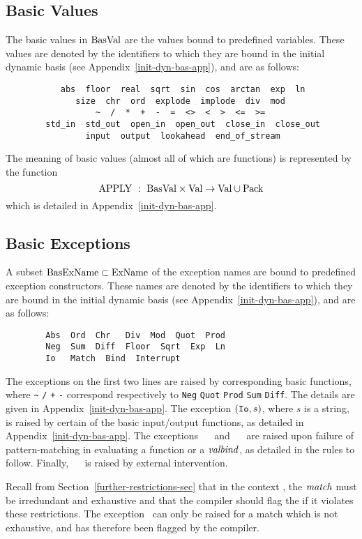 \subsection{Basic Values}
The basic values in ${\rm BasVal}$ are the values bound to predefined variables.
These values are denoted by the identifiers to which they are bound in the
initial dynamic basis (see Appendix~\ref{init-dyn-bas-app}), 
and are as follows:
\begin{verbatim}
           abs  floor  real  sqrt  sin  cos  arctan  exp  ln
              size  chr  ord  explode  implode  div  mod
                  ~  /  *  +  -  =  <>  <  >  <=  >=
        std_in  std_out  open_in  open_out  close_in  close_out
                input  output  lookahead  end_of_stream
\end{verbatim}
The meaning of basic values (almost all of which are functions) is
represented by the function
\[ \APPLY\ :\ \BasVal\times\Val\to\Val\cup\Pack \]
 which is detailed in Appendix~\ref{init-dyn-bas-app}.

\subsection{Basic Exceptions}
\label{bas-exc}
A subset ${\rm BasExName}\subset{\rm ExName}$ of the exception names are bound to predefined
exception constructors.
These names are denoted by the identifiers to which they are bound in the
initial dynamic basis (see Appendix~\ref{init-dyn-bas-app}), 
and are as follows:
\begin{verbatim}
        Abs  Ord  Chr   Div  Mod  Quot  Prod  
        Neg  Sum  Diff  Floor  Sqrt  Exp  Ln
        Io   Match  Bind  Interrupt
\end{verbatim}
The exceptions on the first two  lines are raised by 
corresponding basic functions, where \verb+~+ {\tt /} {\tt *}
{\tt +} {\tt -} correspond respectively to {\tt Neg} {\tt Quot}
{\tt Prod} {\tt Sum} {\tt Diff}. The details are given
in Appendix~\ref{init-dyn-bas-app}. The exception $(\mbox{{\tt Io}},s)$,
where $s$ is a string, is raised
by certain of the basic input/output functions,
as detailed in Appendix~\ref{init-dyn-bas-app}.  
The exceptions ~~ and
~~
are raised upon failure of pattern-matching in evaluating a 
function {\fnexp} or a
${\it valbind}$, as detailed in the rules to follow.   Finally, ~~
is raised by external intervention.

Recall from Section~\ref{further-restrictions-sec} 
that in the context {\fnexp}, the ${\it match}$ 
must be irredundant and exhaustive and that the compiler should flag
the {\match} if it violates these restrictions. The exception~
can only be raised for a match which is not exhaustive, and has therefore 
been flagged by the compiler.

